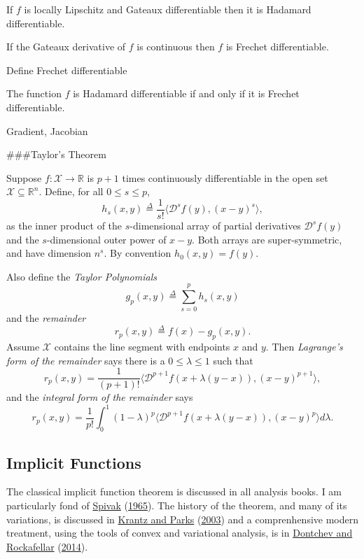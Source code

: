 \documentclass[
  12pt,
]{book}
\begin{document}
If \(f\) is locally Lipschitz and Gateaux differentiable then it is Hadamard differentiable.

If the Gateaux derivative of \(f\) is continuous then \(f\) is Frechet differentiable.

Define Frechet differentiable

The function \(f\) is Hadamard differentiable if and only if it is Frechet differentiable.

Gradient, Jacobian

\#\#\#Taylor's Theorem

Suppose \(f:\mathcal{X}\rightarrow\mathbb{R}\) is \(p+1\) times continuously differentiable in the open set \(\mathcal{X}\subseteq\mathbb{R}^n\). Define, for all \(0\leq s\leq p\),
\[
h_s(x,y)\mathop{=}\limits^{\Delta}\frac{1}{s!}\langle\mathcal{D}^sf(y),(x-y)^{s}\rangle,
\]
as the inner product of the \(s\)-dimensional array
of partial derivatives \(\mathcal{D}^sf(y)\) and the \(s\)-dimensional outer power of \(x-y.\) Both arrays are super-symmetric, and have dimension \(n^s.\) By convention \(h_0(x,y)=f(y)\).

Also define the \emph{Taylor Polynomials}
\[
g_p(x,y)\mathop{=}\limits^{\Delta}\sum_{s=0}^ph_s(x,y)
\]
and the \emph{remainder}
\[
r_p(x,y)\mathop{=}\limits^{\Delta}f(x)-g_p(x,y).
\]
Assume \(\mathcal{X}\) contains the line segment with endpoints \(x\) and \(y\). Then \emph{Lagrange's form of the remainder} says there is a \(0\leq\lambda\leq 1\) such that
\[
r_p(x,y)=\frac{1}{(p+1)!}\langle\mathcal{D}^{p+1}f(x+\lambda(y-x)),(x-y)^{p+1}\rangle,
\]
and the \emph{integral form of the remainder} says
\[
r_p(x,y)=\frac{1}{p!}\int_0^1(1-\lambda)^p\langle\mathcal{D}^{p+1}f(x+\lambda(y-x)),(x-y)^p\rangle d\lambda.
\]

\hypertarget{implicit-functions}{%
\subsection{Implicit Functions}\label{implicit-functions}}

The classical implicit function theorem is discussed in all analysis books. I am particularly fond of \protect\hyperlink{ref-spivak_65}{Spivak} (\protect\hyperlink{ref-spivak_65}{1965}). The history of the theorem, and many of its variations, is discussed in \protect\hyperlink{ref-krantz_parks_03}{Krantz and Parks} (\protect\hyperlink{ref-krantz_parks_03}{2003}) and a comprenhensive modern treatment, using the tools of convex and variational analysis, is in \protect\hyperlink{ref-dontchev_rockafellar_14}{Dontchev and Rockafellar} (\protect\hyperlink{ref-dontchev_rockafellar_14}{2014}).
\end{document}
